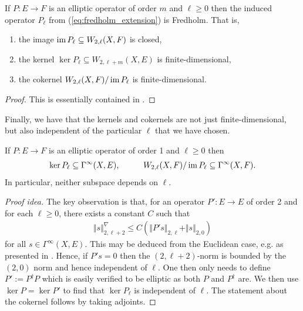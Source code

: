\documentclass[12pt]{ociamthesis}  %
\begin{document}
\begin{theorem}\label{thm:fredholm_extension}
  If $P : E\to F$ is an elliptic operator of order $m$ and $\ell\geq 0$
  then the induced operator $P_\ell$ from (\ref{eq:fredholm_extension})
  is Fredholm. That is,
  \begin{enumerate}
    \item the image $\operatorname{im} P_\ell \subseteq W_{2,\ell}(X,F)$ is closed,
    \item the kernel $\ker P_\ell \subseteq W_{2,\ell+m}(X,E)$ is finite-dimensional,
    \item the cokernel $W_{2,\ell}(X,F)/\operatorname{im} P_\ell$ is finite-dimensional.
  \end{enumerate}
  \begin{proof}
    This is essentially contained in \cite[Proposition 2.3(3)]{reutter2015}.
  \end{proof}
\end{theorem}


Finally, we have that the kernels and cokernels are not just
finite-dimensional, but also independent of the particular $\ell$
that we have chosen.

\begin{theorem}\label{eq:independence_of_l}
  If $P:E\to F$ is an elliptic operator of order 1
  and $\ell\geq 0$ then
  \begin{align*}
    \ker P_\ell \subseteq \Gamma^\infty(X,E),\hspace{1cm}
    W_{2,\ell}(X,F)/\operatorname{im} P_\ell \subseteq \Gamma^\infty(X,F).
  \end{align*}
  In particular, neither subspace depends on $\ell$.
  \begin{proof}[Proof idea]
    The key observation is that, for an operator
    $P':E\to E$ of order 2 and for each $\ell\geq 0$,
    there exists a constant $C$ such that
    \begin{align*}
      \Vert s\Vert^\nabla_{2,\ell+2} \leq C(\Vert P's\Vert_{2,\ell} + \Vert s\Vert_{2,0})
    \end{align*}
    for all $s\in\Gamma^\infty(X,E)$.
    This may be deduced from the Euclidean case, e.g. as presented in
    \cite[6.3.1 Theorem 2]{evans1998}. Hence, if $P's = 0$ then the
    $(2,\ell+2)$-norm is bounded
    by the $(2,0)$ norm and hence independent of $\ell$.
    One then only needs to define $P' := P^\dagger P$ which is easily
    verified to be elliptic as both $P$ and $P^\dagger$ are. We then
    use $\ker P = \ker P'$
    to find that $\ker P_\ell$ is independent of $\ell$. The
    statement about the cokernel follows by taking adjoints.
  \end{proof}
\end{theorem}
\end{document}
